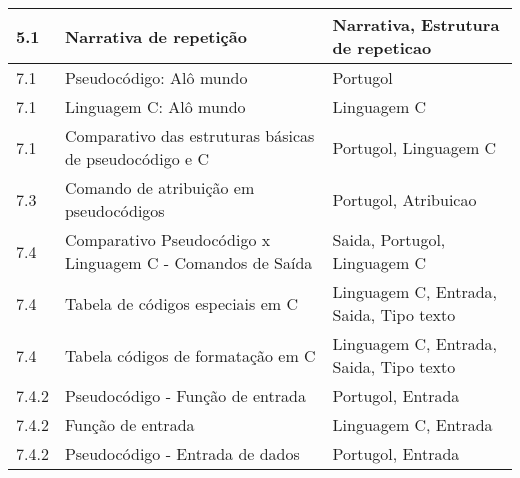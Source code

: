 \begin{longtable}{| p{} | p{} | p{} |}
5.1                  & Narrativa de repetição                                     & Narrativa, Estrutura de repeticao                                                                      \\ \hline
7.1                  & Pseudocódigo: Alô mundo                                    & Portugol                                                                                               \\ \hline
7.1                  & Linguagem C: Alô mundo                                     & Linguagem C                                                                                            \\ \hline
7.1                  & Comparativo das estruturas básicas de pseudocódigo e C     & Portugol, Linguagem C                                                                                  \\ \hline
7.3                  & Comando de atribuição em pseudocódigos                     & Portugol, Atribuicao                                                                                   \\ \hline
7.4                  & Comparativo Pseudocódigo x Linguagem C - Comandos de Saída & Saida, Portugol, Linguagem C                                                                           \\ \hline
7.4                  & Tabela de códigos especiais em C                           & Linguagem C, Entrada, Saida, Tipo texto                                                                \\ \hline
7.4                  & Tabela códigos de formatação em C                          & Linguagem C, Entrada, Saida, Tipo texto                                                                \\ \hline
7.4.2                & Pseudocódigo - Função de entrada                           & Portugol, Entrada                                                                                      \\ \hline
7.4.2                & Função de entrada                                          & Linguagem C, Entrada                                                                                   \\ \hline
7.4.2                & Pseudocódigo - Entrada de dados                            & Portugol, Entrada                                                                                      \\ \hline

\end{longtable}
